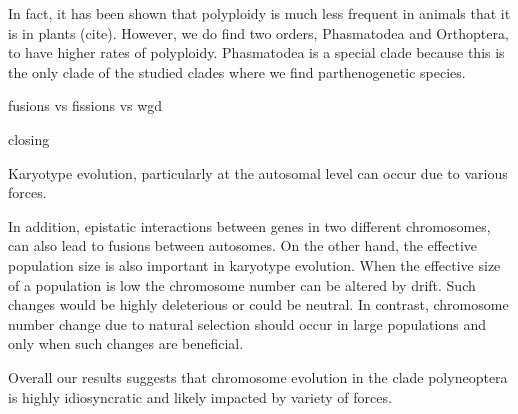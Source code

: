 In fact, it has been shown that polyploidy is much less frequent in animals that it is in plants (cite).
However, we do find two orders, Phasmatodea and Orthoptera, to have higher rates of polyploidy.
Phasmatodea is a special clade because this is the only clade of the studied clades where we find parthenogenetic species. 




fusions vs fissions vs wgd


closing








Karyotype evolution, particularly at the autosomal level can occur due to various forces.

In addition, epistatic interactions between genes in two different chromosomes, can also lead to fusions between autosomes. 
On the other hand, the effective population size is also important in karyotype evolution.
When the effective size of a population is low the chromosome number can be altered by drift. 
Such changes would be highly deleterious or could be neutral. 
In contrast, chromosome number change due to natural selection should occur in large populations and only when such changes are beneficial.





Overall our results suggests that chromosome evolution in the clade polyneoptera is highly idiosyncratic and likely impacted by variety of forces.